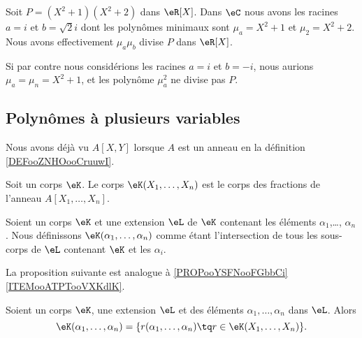 \begin{example}
    Soit \( P=(X^2+1)(X^2+2)\) dans \( \eR[X]\). Dans \( \eC\) nous avons les racines \( a=i\) et \( b=\sqrt{2}i\) dont les polynômes minimaux sont \( \mu_a=X^2+1\) et \( \mu_2=X^2+2\). Nous avons effectivement \( \mu_a\mu_b\) divise \( P\) dans \( \eR[X]\).

    Si par contre nous considérions les racines \( a=i\) et \( b=-i\), nous aurions \( \mu_a=\mu_n=X^2+1\), et les polynôme \( \mu_a^2\) ne divise pas \( P\).
\end{example}

\subsection{Polynômes à plusieurs variables}

Nous avons déjà vu \( A[X,Y]\) lorsque \( A\) est un anneau en la définition \ref{DEFooZNHOooCruuwI}.

\begin{definition}      \label{DEFooRHRKooPqLNOp}
    Soit un corps \( \eK\). Le corps \( \eK(X_1,\ldots, X_n)\) est le corps des fractions de l'anneau \( A[X_1,\ldots, X_n]\).
\end{definition}

\begin{definition}  \label{DEFooOCPHooXneutp}
    Soient un corps \( \eK\) et une extension \( \eL\) de \( \eK\) contenant les éléments \( \alpha_1\),\ldots, \( \alpha_n\). Nous définissons \( \eK(\alpha_1,\ldots, \alpha_n)\) comme étant l'intersection de tous les sous-corps de \( \eL\) contenant \( \eK\) et les \( \alpha_i\).
\end{definition}

La proposition suivante est analogue à \ref{PROPooYSFNooFGbbCi}\ref{ITEMooATPTooVXKdlK}.

\begin{lemma}        \label{LEMooQEJHooAmSNxU}
    Soient un corps \( \eK\), une extension \( \eL\) et des éléments \( \alpha_1,\ldots, \alpha_n\) dans \( \eL\). Alors
    \begin{equation}
        \eK(\alpha_1,\ldots, \alpha_n)=\{ r(\alpha_1,\ldots, \alpha_n)\tq r\in \eK(X_1,\ldots, X_n) \}.
    \end{equation}
\end{lemma}


